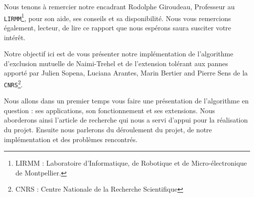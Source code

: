 Nous tenons à remercier notre encadrant \mbox{Rodolphe} \mbox{Giroudeau}, Professeur au \mbox{\texttt{LIRMM}}\footnote{LIRMM : Laboratoire d'Informatique, de Robotique et de Micro-électronique de Montpellier.}, pour son aide, ses conseils et sa disponibilité.
Nous vous remercions également, lecteur, de lire ce rapport que nous espérons saura susciter votre intérêt.

Notre objectif ici est de vous présenter notre implémentation de l'algorithme d'exclusion mutuelle de Naimi-Trehel et de l'extension tolérant aux pannes apporté par \mbox{Julien} \mbox{Sopena}, \mbox{Luciana} \mbox{Arantes}, \mbox{Marin} \mbox{Bertier} and \mbox{Pierre} \mbox{Sens} de la \mbox{\texttt{CNRS}}\footnote{CNRS : Centre Nationale de la Recherche Scientifique}.

Nous allons dans un premier temps vous faire une présentation de l’algorithme en question : ses applications, son fonctionnement et ses extensions. Nous aborderons ainsi l’article de recherche qui nous a servi d’appui pour la réalisation du projet. Ensuite nous parlerons du déroulement du projet, de notre implémentation et des problèmes rencontrés.